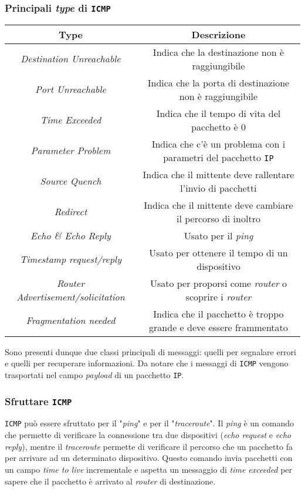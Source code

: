         \subsubsection{Principali \textit{type} di \texttt{ICMP}}
            \begin{table}[H]
                \begin{tabular}{|c|c|}
                    \hline
                    \textbf{Type} & \textbf{Descrizione} \\ \hline
                    \textit{Destination Unreachable} & Indica che la destinazione non è raggiungibile \\ \hline
                    \textit{Port Unreachable} & Indica che la porta di destinazione non è raggiungibile \\ \hline
                    \textit{Time Exceeded} & Indica che il tempo di vita del pacchetto è 0 \\ \hline
                    \textit{Parameter Problem} & Indica che c'è un problema con i parametri del pacchetto \texttt{IP} \\ \hline
                    \textit{Source Quench} & Indica che il mittente deve rallentare l'invio di pacchetti \\ \hline
                    \textit{Redirect} & Indica che il mittente deve cambiare il percorso di inoltro \\ \hline
                    \textit{Echo \& Echo Reply} & Usato per il \textit{ping} \\ \hline
                    \textit{Timestamp request/reply} & Usato per ottenere il tempo di un dispositivo \\ \hline
                    \textit{Router Advertisement/solicitation} & Usato per proporsi come \textit{router} o scoprire i \textit{router} \\ \hline
                    \textit{Fragmentation needed} & Indica che il pacchetto è troppo grande e deve essere frammentato \\ \hline
                \end{tabular}
            \end{table}
        Sono presenti dunque due classi principali di messaggi: quelli per segnalare errori e quelli per recuperare informazioni. Da notare che i messaggi di \texttt{ICMP} vengono trasportati nel campo \textit{payload} di un pacchetto \texttt{IP}.
        \subsubsection{Sfruttare \texttt{ICMP}} \texttt{ICMP} può essere sfruttato per il "\textit{ping}" e per il "\textit{traceroute}". Il \textit{ping} è un comando che permette di verificare la connessione tra due dispositivi (\textit{echo request} e \textit{echo reply}), mentre il \textit{traceroute} permette di verificare il percorso che un pacchetto fa per arrivare ad un determinato dispositivo. Questo comando invia pacchetti con un campo \textit{time to live} incrementale e aspetta un messaggio di \textit{time exceeded} per sapere che il pacchetto è arrivato al \textit{router} di destinazione.

